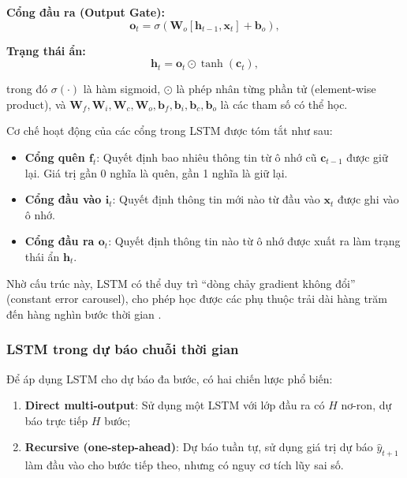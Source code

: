 \textbf{Cổng đầu ra (Output Gate):}
\begin{equation}
    \mathbf{o}_t = \sigma\!\left(\mathbf{W}_o [\mathbf{h}_{t-1}, \mathbf{x}_t] + \mathbf{b}_o\right),
    \label{eq:output_gate}
\end{equation}

\textbf{Trạng thái ẩn:}
\begin{equation}
    \mathbf{h}_t = \mathbf{o}_t \odot \tanh(\mathbf{c}_t),
    \label{eq:hidden_state}
\end{equation}

trong đó $\sigma(\cdot)$ là hàm sigmoid, $\odot$ là phép nhân từng phần tử (element-wise product), và $\mathbf{W}_f, \mathbf{W}_i, \mathbf{W}_c, \mathbf{W}_o, \mathbf{b}_f, \mathbf{b}_i, \mathbf{b}_c, \mathbf{b}_o$ là các tham số có thể học.

Cơ chế hoạt động của các cổng trong LSTM được tóm tắt như sau:
\begin{itemize}
    \item \textbf{Cổng quên $\mathbf{f}_t$}: Quyết định bao nhiêu thông tin từ ô nhớ cũ $\mathbf{c}_{t-1}$ được giữ lại. Giá trị gần 0 nghĩa là quên, gần 1 nghĩa là giữ lại.
    \item \textbf{Cổng đầu vào $\mathbf{i}_t$}: Quyết định thông tin mới nào từ đầu vào $\mathbf{x}_t$ được ghi vào ô nhớ.
    \item \textbf{Cổng đầu ra $\mathbf{o}_t$}: Quyết định thông tin nào từ ô nhớ được xuất ra làm trạng thái ẩn $\mathbf{h}_t$.
\end{itemize}

Nhờ cấu trúc này, LSTM có thể duy trì ``dòng chảy gradient không đổi'' (constant error carousel), cho phép học được các phụ thuộc trải dài hàng trăm đến hàng nghìn bước thời gian \citep{hochreiter1997long}.

\subsubsection{LSTM trong dự báo chuỗi thời gian}

Để áp dụng LSTM cho dự báo đa bước, có hai chiến lược phổ biến:
\begin{enumerate}
    \item \textbf{Direct multi-output}: Sử dụng một LSTM với lớp đầu ra có $H$ nơ-ron, dự báo trực tiếp $H$ bước;
    \item \textbf{Recursive (one-step-ahead)}: Dự báo tuần tự, sử dụng giá trị dự báo $\hat{y}_{t+1}$ làm đầu vào cho bước tiếp theo, nhưng có nguy cơ tích lũy sai số.
\end{enumerate}

